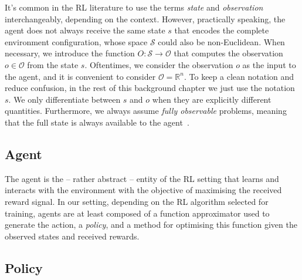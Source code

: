 \begin{remark*}
%
It's common in the \ac{RL} literature to use the terms \emph{state} and \emph{observation} interchangeably, depending on the context.
However, practically speaking, the agent does not always receive the same state $s$ that encodes the complete environment configuration, whose space $\mathcal{S}$ could also be non-Euclidean.
When necessary, we introduce the function $O: \mathcal{S} \to \mathcal{O}$ that computes the observation $o \in \mathcal{O}$ from the state $s$.
Oftentimes, we consider the observation $o$ as the input to the agent, and it is convenient to consider $\mathcal{O} = \mathbb{R}^n$.
To keep a clean notation and reduce confusion, in the rest of this background chapter we just use the notation $s$.
We only differentiate between $s$ and $o$ when they are explicitly different quantities.
Furthermore, we always assume \emph{fully observable} problems, meaning that the full state is always available to the agent~\parencite{lovejoy_survey_1991, jaakkola_reinforcement_1994}. 
%
\end{remark*}

\subsection{Agent}

The agent is the -- rather abstract -- entity of the \ac{RL} setting that learns and interacts with the environment with the objective of maximising the received reward signal.
In our setting, depending on the \ac{RL} algorithm selected for training, agents are at least composed of a function approximator used to generate the action, \ie a \emph{policy}, and a method for optimising this function given the observed states and received rewards.

\subsection{Policy}

